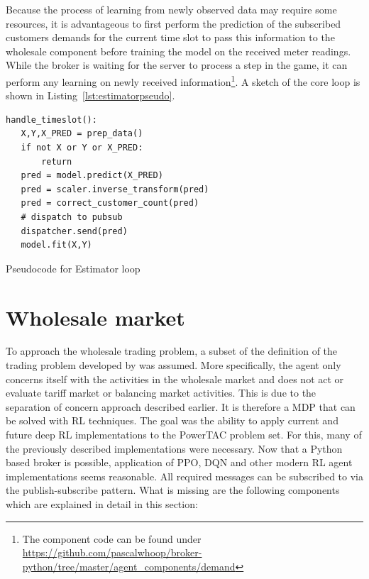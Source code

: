 Because the process of learning from newly observed data may require some resources, it is advantageous to
first perform the prediction of the subscribed customers demands for the current time slot to pass this information to
the wholesale component before training the model on the received meter readings. While the broker is waiting for the
server to process a step in the game, it can perform any learning on newly received information\footnote{The component code can be
found under \url{https://github.com/pascalwhoop/broker-python/tree/master/agent_components/demand}}. A sketch of the
core loop is shown in Listing~\ref{lst:estimatorpseudo}.

\begin{listing}
    \begin{verbatim}
handle_timeslot():
   X,Y,X_PRED = prep_data()
   if not X or Y or X_PRED:
       return
   pred = model.predict(X_PRED)
   pred = scaler.inverse_transform(pred)
   pred = correct_customer_count(pred)
   # dispatch to pubsub
   dispatcher.send(pred)
   model.fit(X,Y)
    \end{verbatim}
    \caption{Pseudocode for Estimator loop}
    \label{lst:estimatorpseudo}
\end{listing}




\section{Wholesale market}
\label{sec:wholesale_market}

To approach the wholesale trading problem, a subset of the definition of the trading problem developed by
\citet{tactexurieli2016mdp} was assumed. More specifically, the agent only concerns itself with the activities in the
wholesale market and does not act or evaluate tariff market or balancing market activities. This is due to the
separation of concern approach described earlier. It is therefore a \ac{MDP} that can be solved with \ac{RL} techniques.
The goal was the ability to apply current and future deep \ac{RL} implementations to the \ac{PowerTAC} problem set. For this,
many of the previously described implementations were necessary. Now that a Python based broker is possible, application
of \ac{PPO}, \ac{DQN} and other modern \ac{RL} agent implementations seems reasonable. All required messages can be
subscribed to via the publish-subscribe pattern. What is missing are the following components which are explained in
detail in this section:


